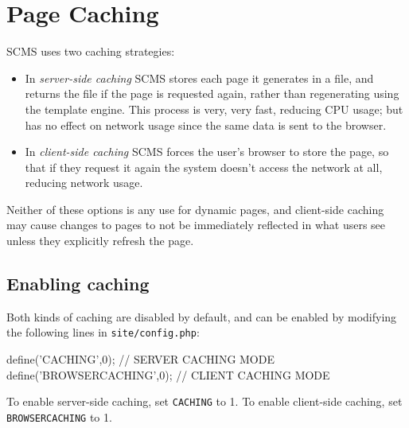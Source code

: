 %
%
%
%
%
%
% 
%
% 
% 
%

\chapter{Page Caching}
\label{cachechap}
SCMS uses two caching strategies:
\begin{itemize}
\item In \emph{server-side caching} SCMS stores each page it generates in a file, and returns the file
if the page is requested again, rather than regenerating using the template engine. This process is very, very
fast, reducing CPU usage; but has no effect on network usage since the same data is sent to the browser.
\item In \emph{client-side caching} SCMS forces the user's browser to store the page, so that if they 
request it again the system doesn't access the network at all, reducing network usage.
\end{itemize}
Neither of these options is any use for dynamic pages, and client-side caching may cause changes to 
pages to not be immediately reflected in what users see unless they explicitly refresh the page.

\section{Enabling caching}
Both kinds of caching are disabled by default, and can be enabled by modifying the following 
lines in \texttt{site/config.php}:
\begin{MyVerbatim}
define('CACHING',0); // SERVER CACHING MODE
define('BROWSERCACHING',0); // CLIENT CACHING MODE
\end{MyVerbatim}
To enable server-side caching, set \texttt{CACHING} to 1.
To enable client-side caching, set \texttt{BROWSERCACHING} to 1.

